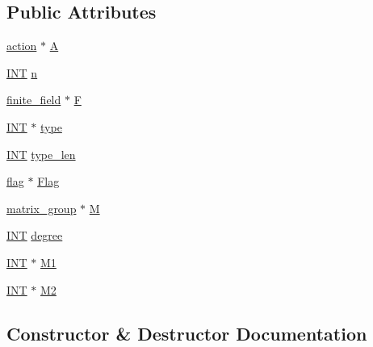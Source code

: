 \subsection*{Public Attributes}
\begin{DoxyCompactItemize}
\item 
\mbox{\hyperlink{classaction}{action}} $\ast$ \mbox{\hyperlink{classaction__on__flags_af161710bdb8f1be19186f478b7c4bf56}{A}}
\item 
\mbox{\hyperlink{galois_8h_a09fddde158a3a20bd2dcadb609de11dc}{I\+NT}} \mbox{\hyperlink{classaction__on__flags_a9f9c49d0ef564cd48bdef157960e7321}{n}}
\item 
\mbox{\hyperlink{classfinite__field}{finite\+\_\+field}} $\ast$ \mbox{\hyperlink{classaction__on__flags_a35e77095744bf482b135903794b21737}{F}}
\item 
\mbox{\hyperlink{galois_8h_a09fddde158a3a20bd2dcadb609de11dc}{I\+NT}} $\ast$ \mbox{\hyperlink{classaction__on__flags_a358929581b44014351a7501202d14b17}{type}}
\item 
\mbox{\hyperlink{galois_8h_a09fddde158a3a20bd2dcadb609de11dc}{I\+NT}} \mbox{\hyperlink{classaction__on__flags_aa83def90a92203f4a639ff4af313540b}{type\+\_\+len}}
\item 
\mbox{\hyperlink{classflag}{flag}} $\ast$ \mbox{\hyperlink{classaction__on__flags_a7cdd6fc168073a1885e3e0881ef51063}{Flag}}
\item 
\mbox{\hyperlink{classmatrix__group}{matrix\+\_\+group}} $\ast$ \mbox{\hyperlink{classaction__on__flags_a3d765c56642ac562f40c88ed42b3d3f5}{M}}
\item 
\mbox{\hyperlink{galois_8h_a09fddde158a3a20bd2dcadb609de11dc}{I\+NT}} \mbox{\hyperlink{classaction__on__flags_aa3bd4d87483358d30153ca8c80cf0f37}{degree}}
\item 
\mbox{\hyperlink{galois_8h_a09fddde158a3a20bd2dcadb609de11dc}{I\+NT}} $\ast$ \mbox{\hyperlink{classaction__on__flags_aad816c6ca2f3d045bd535e78d1f64dd2}{M1}}
\item 
\mbox{\hyperlink{galois_8h_a09fddde158a3a20bd2dcadb609de11dc}{I\+NT}} $\ast$ \mbox{\hyperlink{classaction__on__flags_a9a055e5aa97595c78a252c976f44cd93}{M2}}
\end{DoxyCompactItemize}


\subsection{Constructor \& Destructor Documentation}
\mbox{\label{classaction__on__flags_a8bb1c84b70732c6cf77d25e4f7c0dcb6}} 
